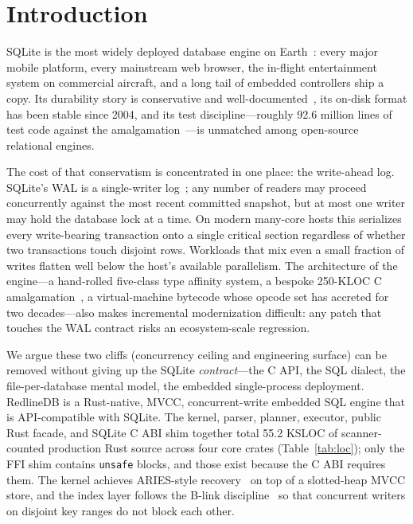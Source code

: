 \section{Introduction}\label{sec:intro}

SQLite is the most widely deployed database engine on
Earth~\cite{sqlite_mostdeployed}: every major mobile platform, every
mainstream web browser, the in-flight entertainment system on commercial
aircraft, and a long tail of embedded controllers ship a copy. Its
durability story is conservative and well-documented~\cite{sqlite_arch},
its on-disk format has been stable since 2004, and its test
discipline---roughly 92.6 million lines of test code against the
amalgamation~\cite{sqlite_testing}---is unmatched among open-source
relational engines.

The cost of that conservatism is concentrated in one place: the
write-ahead log. SQLite's WAL is a single-writer
log~\cite{sqlite_wal}; any number of readers may proceed concurrently
against the most recent committed snapshot, but at most one writer may
hold the database lock at a time. On modern many-core hosts this
serializes every write-bearing transaction onto a single critical
section regardless of whether two transactions touch disjoint rows.
Workloads that mix even a small fraction of writes flatten well below
the host's available parallelism. The architecture of the engine---a
hand-rolled five-class type affinity system, a bespoke 250-KLOC C
amalgamation~\cite{sqlite_footprint}, a virtual-machine bytecode whose
opcode set has accreted for two decades---also makes incremental
modernization difficult: any patch that touches the WAL contract risks
an ecosystem-scale regression.

We argue these two cliffs (concurrency ceiling and engineering surface)
can be removed without giving up the SQLite \emph{contract}---the C
API, the SQL dialect, the file-per-database mental model, the embedded
single-process deployment. RedlineDB is a Rust-native, MVCC,
concurrent-write embedded SQL engine that is API-compatible with
SQLite. %
The kernel, parser, planner, executor, public Rust facade, and
SQLite C ABI shim together total 55.2 KSLOC of scanner-counted
production Rust source across four core crates (Table~\ref{tab:loc});
only the FFI shim contains \texttt{unsafe} blocks, and those exist
because the C ABI requires them.
The kernel achieves ARIES-style recovery~\cite{mohan1992aries} on
top of a slotted-heap MVCC store, and the index layer follows the
B-link discipline~\cite{lehman1981blink,srinivasan1991bplus} so that
concurrent writers on disjoint key ranges do not block each other.


